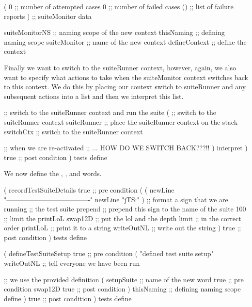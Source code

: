     (
      0             ;; number of attempted cases
      0             ;; number of failed cases
      ()            ;; list of failure reports
    )               ;; suiteMonitor data
  
    suiteMonitorNS  ;; naming scope of the new context
    thisNaming      ;; defining naming scope
    suiteMonitor    ;; name of the new context
    defineContext   ;; define the context
\stopJoylolCode

Finally we want to switch to the suiteRunner context, however, again, we 
also want to specify what actions to take when the suiteMonitor context 
switches back to this context. We do this by placing our context switch to 
suiteRunner and any subsequent actions into a list and then we interpret 
this list. 

\startJoylolCode
    ;; switch to the suiteRunner context and run the suite
    (
      ;; switch to the suiteRunner context
      suiteRunner ;; place the suiteRunner context on the stack
      switchCtx   ;; switch to the suiteRunner context
    
      ;; when we are re-activated
      ;; ... HOW DO WE SWITCH BACK???!!
    )
    interpret
  )
  { true }        ;; post condition
)
tests
define
\stopJoylolCode

We now define the , 
, and  words. 

\startJoylolCode
(
  recordTestSuiteDetails
  { true } ;; pre condition
  (
    (
      newLine
      "-------------------------------------"
      newLine
      "jTS:"
    )           ;; format a sign that we are running
                ;; the test suite
    prepend     ;; prepend this sign to the name of the suite
    100         ;; limit the printLoL
    swap12D     ;; put the lol and the depth limit 
                ;; in the correct order
    printLoL    ;; print it to a string
    writeOutNL  ;; write out the string
  )
  { true }      ;; post condition
)
tests
define
\stopJoylolCode

\startJoylolCode
(
  defineTestSuiteSetup
  { true }        ;; pre condition
  (
    "defined test suite setup"
    writeOutNL    ;; tell everyone we have been run

                  ;; we use the provided definition
    (
      setupSuite  ;; name of the new word
      { true }    ;; pre condition
      swap12D
      { true }    ;; post condition
    )
    thisNaming  ;; defining naming scope
    define
  )
  { true } ;; post condition
)
tests
define
\stopJoylolCode

